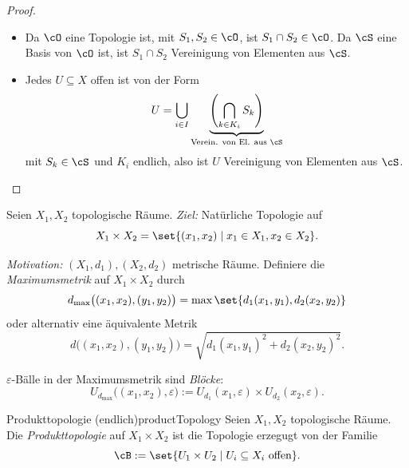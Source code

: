 \documentclass[language=ngerman]{TemplateLecture} %
\begin{document}
\begin{proof}
    \begin{itemize}
        \item[\enquote{$\Rightarrow$}:] Da $\cO$ eine Topologie ist, mit $S_1, S_2 \in \cO$, ist $S_1 \cap S_2 \in \cO$. Da $\cS$ eine Basis von $\cO$ ist, ist $S_1 \cap S_2$ Vereinigung von Elementen aus $\cS$.
        \item[\enquote{$\Leftarrow$}:] Jedes $U \subseteq X$ offen ist von der Form 
        \begin{equation*}
            U = \bigcup_{i \in I} \underset{\text{Verein. von El. aus $\cS$}}{\underbrace{\left(\bigcap_{k \in K_i} S_k\right)}}
        \end{equation*}
        mit $S_k \in \cS$ und $K_i$ endlich, also ist $U$ Vereinigung von Elementen aus $\cS$.
    \end{itemize}
\end{proof}

Seien $X_1, X_2$ topologische Räume. \emph{Ziel:} Natürliche Topologie auf 
\begin{equation*}
    X_1 \times X_2 = \set{(x_1, x_2) \mid x_1 \in X_1, x_2 \in X_2}.
\end{equation*}

\emph{Motivation:} $(X_1, d_1), (X_2, d_2)$ metrische Räume. Definiere die \emph{Maximumsmetrik} auf $X_1 \times X_2$ durch 
\begin{equation*}
    d_{\max} \bigl((x_1,x_2),(y_1,y_2)\bigr) = \max\set{d_1(x_1,y_1), d_2(x_2,y_2)}
\end{equation*}
oder alternativ eine äquivalente Metrik 
\begin{equation*}
    d\bigl((x_1,x_2), (y_1,y_2)\bigr) = \sqrt{d_1(x_1,y_1)^2 + d_2(x_2,y_2)^2}.
\end{equation*}

$\varepsilon$-Bälle in der Maximumsmetrik sind \emph{Blöcke}:
\begin{equation*}
    U_{d_{\max}}\bigl((x_1,x_2), \varepsilon\bigr) := U_{d_1}(x_1, \varepsilon) \times U_{d_2}(x_2, \varepsilon).
\end{equation*}

\begin{defi}{Produkttopologie (endlich)}{productTopology}
    Seien $X_1, X_2$ topologische Räume. Die \emph{Produkttopologie} auf $X_1 \times X_2$ ist die Topologie erzegugt von der Familie 
    \begin{equation*}
        \cB := \set{U_1 \times U_2 \mid U_i \subseteq X_i \text{ offen}}.
    \end{equation*}
\end{defi}
\end{document}

